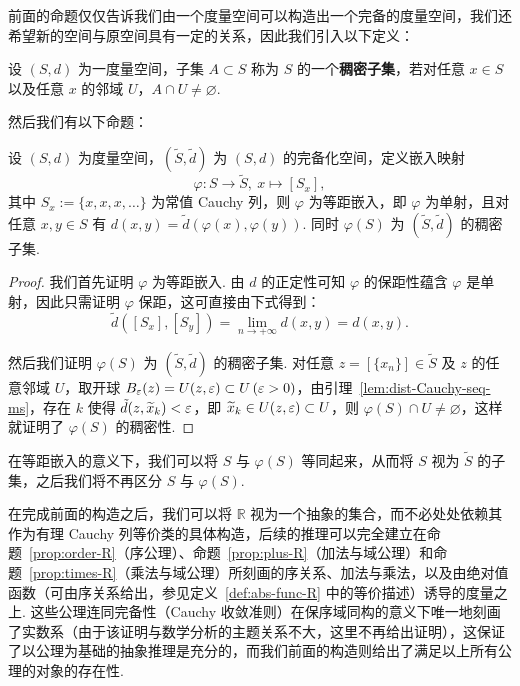 \documentclass[../main.tex]{subfiles}
\begin{document}
前面的命题仅仅告诉我们由一个度量空间可以构造出一个完备的度量空间，我们还希望新的空间与原空间具有一定的关系，因此我们引入以下定义：

\begin{definition}[度量空间的稠密子集的定义] \label{def:dense-subset-ms}
    设 $(S, d)$ 为一度量空间，子集 $A \subset S$ 称为 $S$ 的一个\textbf{稠密子集}，若对任意 $x \in S$ 以及任意 $x$ 的邻域 $U$，$A \cap U \neq \varnothing$. 
\end{definition}

然后我们有以下命题：

\begin{proposition} \label{prop:completion-embedding-ms}
    设 $(S, d)$ 为度量空间，$(\widetilde{S}, \tilde{d})$ 为 $(S, d)$ 的完备化空间，定义嵌入映射 
    $$
    \varphi:S \to \widetilde{S},\ x \mapsto [S_x], 
    $$
    其中 $S_x := \{x, x, x, \dots\}$ 为常值 Cauchy 列，则 $\varphi$ 为等距嵌入，即 $\varphi$ 为单射，且对任意 $x, y \in S$ 有 $d(x, y) = \tilde{d}(\varphi(x), \varphi(y))$. 同时 $\varphi(S)$ 为 $(\widetilde{S}, \tilde{d})$ 的稠密子集. 
\end{proposition}

\begin{proof}
    我们首先证明 $\varphi$ 为等距嵌入. 由 $d$ 的正定性可知 $\varphi$ 的保距性蕴含 $\varphi$ 是单射，因此只需证明 $\varphi$ 保距，这可直接由下式得到：
    $$
    \tilde{d}([S_x], [S_y]) = \lim\limits_{n \to +\infty} d(x, y) = d(x, y). 
    $$

    然后我们证明 $\varphi(S)$ 为 $(\widetilde{S}, \tilde{d})$ 的稠密子集. 对任意 $z = [\{x_n\}] \in \widetilde{S}$ 及 $z$ 的任意邻域 $U$，取开球 $B_\varepsilon(z) = U(z, \varepsilon) \subset U \,(\varepsilon > 0)$，由引理~\ref{lem:dist-Cauchy-seq-ms}，存在 $k$ 使得 $\tilde{d}(z, \widetilde{x}_k) < \varepsilon$，即 $\widetilde{x}_k \in U(z, \varepsilon) \subset U$，则 $\varphi(S) \cap U \neq \varnothing$，这样就证明了 $\varphi(S)$ 的稠密性. 
\end{proof}

\begin{remark}
    在等距嵌入的意义下，我们可以将 $S$ 与 $\varphi(S)$ 等同起来，从而将 $S$ 视为 $\widetilde{S}$ 的子集，之后我们将不再区分 $S$ 与 $\varphi(S)$. 
\end{remark}

在完成前面的构造之后，我们可以将 $\mathbb R$ 视为一个抽象的集合，而不必处处依赖其作为有理 Cauchy 列等价类的具体构造，后续的推理可以完全建立在命题~\ref{prop:order-R}（序公理）、命题~\ref{prop:plus-R}（加法与域公理）和命题~\ref{prop:times-R}（乘法与域公理）所刻画的序关系、加法与乘法，以及由绝对值函数（可由序关系给出，参见定义~\ref{def:abs-func-R} 中的等价描述）诱导的度量之上. 这些公理连同完备性（Cauchy 收敛准则）在保序域同构的意义下唯一地刻画了实数系（由于该证明与数学分析的主题关系不大，这里不再给出证明），这保证了以公理为基础的抽象推理是充分的，而我们前面的构造则给出了满足以上所有公理的对象的存在性. 
\end{document}
